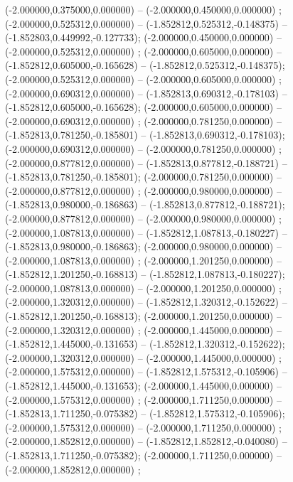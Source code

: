  (-2.000000,0.375000,0.000000) -- (-2.000000,0.450000,0.000000) ;
 (-2.000000,0.525312,0.000000) -- (-1.852812,0.525312,-0.148375) -- (-1.852803,0.449992,-0.127733);
 (-2.000000,0.450000,0.000000) -- (-2.000000,0.525312,0.000000) ;
 (-2.000000,0.605000,0.000000) -- (-1.852812,0.605000,-0.165628) -- (-1.852812,0.525312,-0.148375);
 (-2.000000,0.525312,0.000000) -- (-2.000000,0.605000,0.000000) ;
 (-2.000000,0.690312,0.000000) -- (-1.852813,0.690312,-0.178103) -- (-1.852812,0.605000,-0.165628);
 (-2.000000,0.605000,0.000000) -- (-2.000000,0.690312,0.000000) ;
 (-2.000000,0.781250,0.000000) -- (-1.852813,0.781250,-0.185801) -- (-1.852813,0.690312,-0.178103);
 (-2.000000,0.690312,0.000000) -- (-2.000000,0.781250,0.000000) ;
 (-2.000000,0.877812,0.000000) -- (-1.852813,0.877812,-0.188721) -- (-1.852813,0.781250,-0.185801);
 (-2.000000,0.781250,0.000000) -- (-2.000000,0.877812,0.000000) ;
 (-2.000000,0.980000,0.000000) -- (-1.852813,0.980000,-0.186863) -- (-1.852813,0.877812,-0.188721);
 (-2.000000,0.877812,0.000000) -- (-2.000000,0.980000,0.000000) ;
 (-2.000000,1.087813,0.000000) -- (-1.852812,1.087813,-0.180227) -- (-1.852813,0.980000,-0.186863);
 (-2.000000,0.980000,0.000000) -- (-2.000000,1.087813,0.000000) ;
 (-2.000000,1.201250,0.000000) -- (-1.852812,1.201250,-0.168813) -- (-1.852812,1.087813,-0.180227);
 (-2.000000,1.087813,0.000000) -- (-2.000000,1.201250,0.000000) ;
 (-2.000000,1.320312,0.000000) -- (-1.852812,1.320312,-0.152622) -- (-1.852812,1.201250,-0.168813);
 (-2.000000,1.201250,0.000000) -- (-2.000000,1.320312,0.000000) ;
 (-2.000000,1.445000,0.000000) -- (-1.852812,1.445000,-0.131653) -- (-1.852812,1.320312,-0.152622);
 (-2.000000,1.320312,0.000000) -- (-2.000000,1.445000,0.000000) ;
 (-2.000000,1.575312,0.000000) -- (-1.852812,1.575312,-0.105906) -- (-1.852812,1.445000,-0.131653);
 (-2.000000,1.445000,0.000000) -- (-2.000000,1.575312,0.000000) ;
 (-2.000000,1.711250,0.000000) -- (-1.852813,1.711250,-0.075382) -- (-1.852812,1.575312,-0.105906);
 (-2.000000,1.575312,0.000000) -- (-2.000000,1.711250,0.000000) ;
 (-2.000000,1.852812,0.000000) -- (-1.852812,1.852812,-0.040080) -- (-1.852813,1.711250,-0.075382);
 (-2.000000,1.711250,0.000000) -- (-2.000000,1.852812,0.000000) ;
